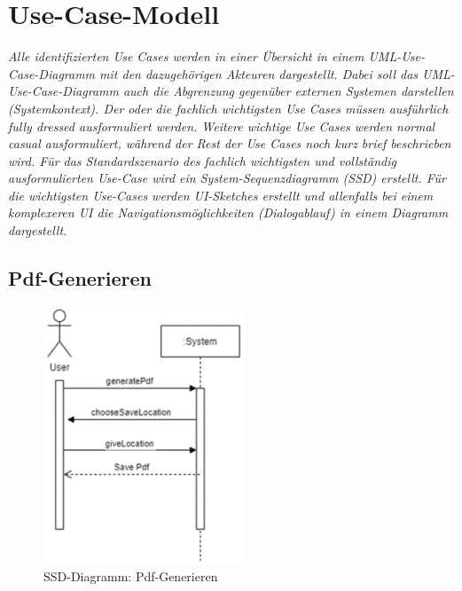\section{Use-Case-Modell}

\textit{Alle identifizierten Use Cases werden in einer Übersicht in einem UML-Use-Case-Diagramm mit den dazugehörigen Akteuren dargestellt. Dabei soll das UML-Use-Case-Diagramm auch die Abgrenzung gegenüber externen Systemen darstellen (Systemkontext). \newline
Der oder die fachlich wichtigsten Use Cases müssen ausführlich fully dressed ausformuliert werden. Weitere wichtige Use Cases werden normal casual ausformuliert, während der Rest der Use Cases noch kurz brief beschrieben wird. Für das Standardszenario des fachlich wichtigsten und vollständig ausformulierten Use-Case wird ein System-Sequenzdiagramm (SSD) erstellt.
Für die wichtigsten Use-Cases werden UI-Sketches erstellt und allenfalls bei einem komplexeren UI die Navigationsmöglichkeiten (Dialogablauf) in einem Diagramm dargestellt. }

\subsection{Pdf-Generieren}

\begin{figure}
	\includegraphics[width=6cm]{rec/UseCasePdfErstellen}
	\caption[SSD-Diagramm: Pdf-Generieren]{SSD-Diagramm: Pdf-Generieren}
	\label{fig:usecasepdferstellen}
\end{figure}
	
